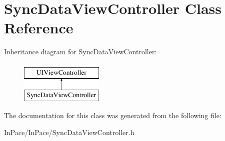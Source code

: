 \hypertarget{interfaceSyncDataViewController}{\section{Sync\-Data\-View\-Controller Class Reference}
\label{interfaceSyncDataViewController}
}
Inheritance diagram for Sync\-Data\-View\-Controller\-:\begin{figure}[H]
\begin{center}
\leavevmode
\includegraphics[height=2.000000cm]{interfaceSyncDataViewController}
\end{center}
\end{figure}


The documentation for this class was generated from the following file\-:\begin{DoxyCompactItemize}
\item 
In\-Pace/\-In\-Pace/Sync\-Data\-View\-Controller.\-h\end{DoxyCompactItemize}
